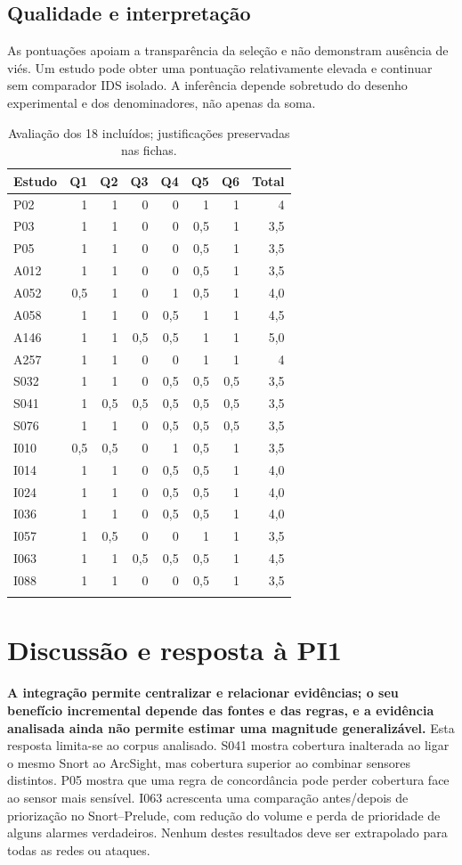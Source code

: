 \documentclass[11pt,a4paper]{article}
\begin{document}
\subsection{Qualidade e interpretação}
As pontuações apoiam a transparência da seleção e não demonstram ausência de viés. Um estudo pode obter uma pontuação relativamente elevada e continuar sem comparador IDS isolado. A inferência depende sobretudo do desenho experimental e dos denominadores, não apenas da soma.
\begin{longtable}{@{}lrrrrrrr@{}}\toprule
Estudo & Q1 & Q2 & Q3 & Q4 & Q5 & Q6 & Total\\\midrule\endhead
P02 & 1 & 1 & 0 & 0 & 1 & 1 & 4\\
P03 & 1 & 1 & 0 & 0 & 0,5 & 1 & 3,5\\
P05 & 1 & 1 & 0 & 0 & 0,5 & 1 & 3,5\\
A012 & 1 & 1 & 0 & 0 & 0,5 & 1 & 3,5\\
A052 & 0,5 & 1 & 0 & 1 & 0,5 & 1 & 4,0\\
A058 & 1 & 1 & 0 & 0,5 & 1 & 1 & 4,5\\
A146 & 1 & 1 & 0,5 & 0,5 & 1 & 1 & 5,0\\
A257 & 1 & 1 & 0 & 0 & 1 & 1 & 4\\
S032 & 1 & 1 & 0 & 0,5 & 0,5 & 0,5 & 3,5\\
S041 & 1 & 0,5 & 0,5 & 0,5 & 0,5 & 0,5 & 3,5\\
S076 & 1 & 1 & 0 & 0,5 & 0,5 & 0,5 & 3,5\\
I010 & 0,5 & 0,5 & 0 & 1 & 0,5 & 1 & 3,5\\
I014 & 1 & 1 & 0 & 0,5 & 0,5 & 1 & 4,0\\
I024 & 1 & 1 & 0 & 0,5 & 0,5 & 1 & 4,0\\
I036 & 1 & 1 & 0 & 0,5 & 0,5 & 1 & 4,0\\
I057 & 1 & 0,5 & 0 & 0 & 1 & 1 & 3,5\\
I063 & 1 & 1 & 0,5 & 0,5 & 0,5 & 1 & 4,5\\
I088 & 1 & 1 & 0 & 0 & 0,5 & 1 & 3,5\\
\bottomrule\caption{Avaliação dos 18 incluídos; justificações preservadas nas fichas.}\end{longtable}
\section{Discussão e resposta à PI1}
\textbf{A integração permite centralizar e relacionar evidências; o seu benefício incremental depende das fontes e das regras, e a evidência analisada ainda não permite estimar uma magnitude generalizável.} Esta resposta limita-se ao corpus analisado. S041 mostra cobertura inalterada ao ligar o mesmo Snort ao ArcSight, mas cobertura superior ao combinar sensores distintos. P05 mostra que uma regra de concordância pode perder cobertura face ao sensor mais sensível. I063 acrescenta uma comparação antes/depois de priorização no Snort--Prelude, com redução do volume e perda de prioridade de alguns alarmes verdadeiros. Nenhum destes resultados deve ser extrapolado para todas as redes ou ataques.
\end{document}
